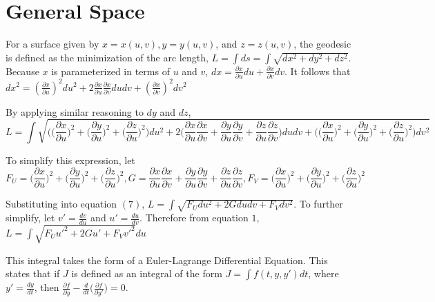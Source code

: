 \documentclass{article}
\begin{document}
\section{General Space}
For a surface given by $x=x(u,v), y=y(u,v)$, and $z=z(u,v)$, the geodesic is defined as the minimization of the arc length, $L=\int ds = \int \sqrt{dx^2+dy^2+dz^2}$.
Because $x$ is parameterized in terms of $u$ and $v$, $dx=\frac{\partial x}{\partial u} du+\frac{\partial x}{\partial v} dv$. 
It follows that $dx^2 = (\frac{\partial x}{\partial u})^2 du^2 + 2\frac{\partial x}{\partial u}\frac{\partial x}{\partial v}du dv + (\frac{\partial x}{\partial v})^2 dv^2$

By applying similar reasoning to $dy$ and $dz$,
\begin{equation}
    L = \int \sqrt{\bigg(\Big(\frac{\partial x}{\partial u}\Big)^2+\Big(\frac{\partial y}{\partial u}\Big)^2+\Big(\frac{\partial z}{\partial u}\Big)^2\bigg) du^2 + 2\Big(\frac{\partial x}{\partial u}\frac{\partial x}{\partial v} + \frac{\partial y}{\partial u}\frac{\partial y}{\partial v} + \frac{\partial z}{\partial u}\frac{\partial z}{\partial v}\Big)du dv + \bigg(\Big(\frac{\partial x}{\partial u}\Big)^2+\Big(\frac{\partial y}{\partial u}\Big)^2+\Big(\frac{\partial z}{\partial u}\Big)^2\bigg) dv^2}
\end{equation}

To simplify this expression, let 
\begin{equation}
    F_U = \Big(\frac{\partial x}{\partial u}\Big)^2+\Big(\frac{\partial y}{\partial u}\Big)^2+\Big(\frac{\partial z}{\partial u}\Big)^2, 
    G = \frac{\partial x}{\partial u}\frac{\partial x}{\partial v} + \frac{\partial y}{\partial u}\frac{\partial y}{\partial v} + \frac{\partial z}{\partial u}\frac{\partial z}{\partial v}, 
    F_V = \Big(\frac{\partial x}{\partial u}\Big)^2+\Big(\frac{\partial y}{\partial u}\Big)^2+\Big(\frac{\partial z}{\partial u}\Big)^2
\end{equation}

Substituting into equation $(7)$, $L = \int \sqrt{F_U du^2 + 2G du dv + F_V dv^2}$. To further simplify, let $v'=\frac{dv}{du}$ and $u'=\frac{du}{dv}$. Therefore from equation $1$, $L=\int \sqrt{F_U u'^2 + 2Gu' + F_V v'^2}du$

This integral takes the form of a Euler-Lagrange Differential Equation. This states that if $J$ is defined as an integral of the form $J=\int f(t,y,y')dt$, where $y'=\frac{dy}{dt}$, then $\frac{\partial f}{\partial y} - \frac{d}{dt}\Big(\frac{\partial f}{\partial y'}\Big)=0$.
\end{document}
